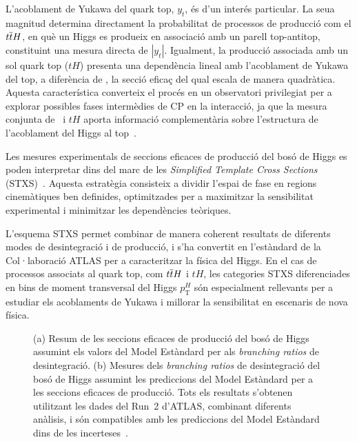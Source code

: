 L’acoblament de Yukawa del quark top, \(y_{t}\), és d’un interés particular. La seua magnitud determina directament la probabilitat de processos de producció com el \(t\overline{t}H\), en què un Higgs es produeix en associació amb un parell top-antitop, constituint una mesura directa de \(|y_{t}|\). Igualment, la producció associada amb un sol quark top (\(tH\)) presenta una dependència lineal amb l’acoblament de Yukawa del top, a diferència de \ttH, la secció eficaç del qual escala de manera quadràtica. Aquesta característica converteix el procés en un observatori privilegiat per a explorar possibles fases intermèdies de CP en la interacció, ja que la mesura conjunta de \ttH\ i \(tH\) aporta informació complementària sobre l’estructura de l’acoblament del Higgs al top~\cite{Bernreuther:2002uj,Brod:2013cka}.  

Les mesures experimentals de seccions eficaces de producció del bosó de Higgs es poden interpretar dins del marc de les \textit{Simplified Template Cross Sections} (STXS)~\cite{badger2016leshouches2015physics,STXS11}. Aquesta estratègia consisteix a dividir l’espai de fase en regions cinemàtiques ben definides, optimitzades per a maximitzar la sensibilitat experimental i minimitzar les dependències teòriques.  

L’esquema STXS permet combinar de manera coherent resultats de diferents modes de desintegració i de producció, i s’ha convertit en l’estàndard de la Col·laboració ATLAS per a caracteritzar la física del Higgs. En el cas de processos associats al quark top, com \(t\overline{t}H\) i \(tH\), les categories STXS diferenciades en bins de moment transversal del Higgs \(p_{\text{T}}^{H}\) són especialment rellevants per a estudiar els acoblaments de Yukawa i millorar la sensibilitat en escenaris de nova física.

\begin{figure}[htbp]
  \centering
  \hfill
  \caption{(a) Resum de les seccions eficaces de producció del bosó de Higgs assumint els valors del Model Estàndard per als \textit{branching ratios} de desintegració.  
  (b) Mesures dels \textit{branching ratios} de desintegració del bosó de Higgs assumint les prediccions del Model Estàndard per a les seccions eficaces de producció.  
  Tots els resultats s’obtenen utilitzant les dades del Run~2 d’ATLAS, combinant diferents anàlisis, i són compatibles amb les prediccions del Model Estàndard dins de les incerteses~\cite{Nature_ATLAS}.}  
  \label{res:higgs_mu}
\end{figure}

